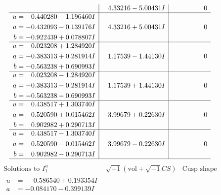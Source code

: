 \documentclass[1p]{elsarticle_modified}
\theoremstyle{definition}
\newcommand{\I}{\sqrt{-1}}
\begin{document}
$$\begin{array}{c|c|c}
 & \phantom{-}4.33216 - 5.00431 I & \phantom{-0.000000 } 0 \\ \hline\begin{aligned}
u &= \phantom{-}0.440280 - 1.196460 I \\
a &= -0.432093 - 0.139176 I \\
b &= -0.922439 + 0.078807 I\end{aligned}
 & \phantom{-}4.33216 + 5.00431 I & \phantom{-0.000000 } 0 \\ \hline\begin{aligned}
u &= \phantom{-}0.023208 + 1.284920 I \\
a &= -0.383313 + 0.281914 I \\
b &= -0.563238 + 0.690993 I\end{aligned}
 & \phantom{-}1.17539 - 1.44130 I & \phantom{-0.000000 } 0 \\ \hline\begin{aligned}
u &= \phantom{-}0.023208 - 1.284920 I \\
a &= -0.383313 - 0.281914 I \\
b &= -0.563238 - 0.690993 I\end{aligned}
 & \phantom{-}1.17539 + 1.44130 I & \phantom{-0.000000 } 0 \\ \hline\begin{aligned}
u &= \phantom{-}0.438517 + 1.303740 I \\
a &= \phantom{-}0.520590 + 0.015462 I \\
b &= \phantom{-}0.902982 + 0.290713 I\end{aligned}
 & \phantom{-}3.99679 + 0.22630 I & \phantom{-0.000000 } 0 \\ \hline\begin{aligned}
u &= \phantom{-}0.438517 - 1.303740 I \\
a &= \phantom{-}0.520590 - 0.015462 I \\
b &= \phantom{-}0.902982 - 0.290713 I\end{aligned}
 & \phantom{-}3.99679 - 0.22630 I & \phantom{-0.000000 } 0\\
 \hline 
 \end{array}$$\newpage$$\begin{array}{c|c|c}  
\text{Solutions to }I^u_{1}& \I (\text{vol} + \sqrt{-1}CS) & \text{Cusp shape}\\
 \hline 
\begin{aligned}
u &= \phantom{-}0.586540 + 0.193354 I \\
a &= -0.084170 - 0.399139 I \\

\end{aligned}
\end{array}$$
\end{document}
